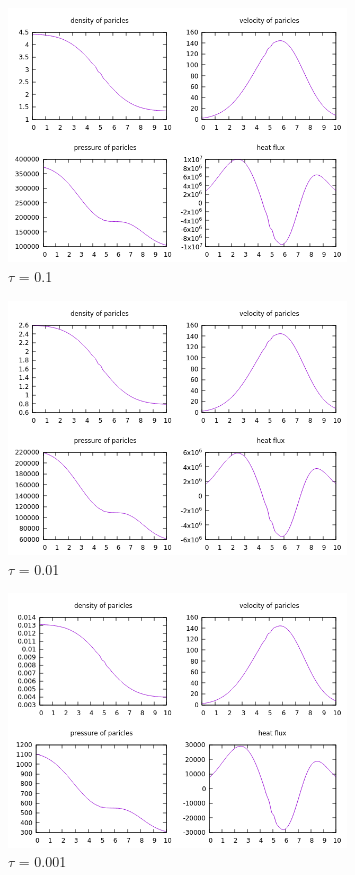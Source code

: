 \documentclass[paper=a4, fontsize=12pt]{scrartcl}
\begin{document}
\begin{figure}[H]
        \centering
        \includegraphics[width=0.8\textwidth]{tau0-1}
        \caption{$\tau$ = 0.1}
        \label{fig:tau0-1}
\end{figure}
\begin{figure}[H]
        \centering
        \includegraphics[width=0.8\textwidth]{tau0-01}
        \caption{$\tau$ = 0.01}
        \label{fig:tau0-01}
\end{figure}
\begin{figure}[H]
        \centering
        \includegraphics[width=0.8\textwidth]{tau0-001}
        \caption{$\tau$ = 0.001}
        \label{fig:tau0-001}
\end{figure}
\end{document}
